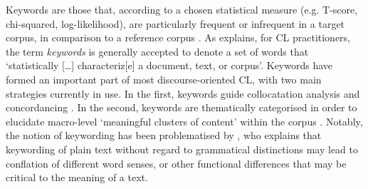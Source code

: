 Keywords are those that, according to a chosen statistical measure (e.g. T\hyp{}score, chi\hyp{}squared, log\hyp{}likelihood), are particularly frequent or infrequent in a target \gls{corpus}, in comparison to a reference \gls{corpus} \cite[see][for an explanation of common measures]{rayson_corpus_2012}. As \textcite[p.~1]{rayson_corpus_2012} explains, for \gls{CL} practitioners, the term \emph{keywords} is generally accepted to denote a set of words that `statistically [\dots] characteriz[e] a document, text, or \gls{corpus}'. Keywords have formed an important part of most discourse\hyp{}oriented \gls{CL}, with two main strategies currently in use. In the first, keywords guide collocatation analysis and concordancing \cite[as in][]{harvey_am_2007}. In the second, keywords are thematically categorised in order to elucidate macro-level `meaningful clusters of content' within the \gls{corpus} \cite[p.~357]{harvey_disclosures_2012,williams_applying_2013}. Notably, the notion of keywording has been problematised by \textcite{baker_querying_2004}, who explains that keywording of plain text without regard to grammatical distinctions may lead to conflation of different word senses, or other functional differences that may be critical to the meaning of a text. 



